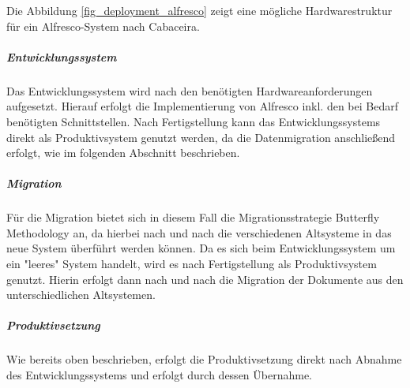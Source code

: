 Die Abbildung \ref{fig_deployment_alfresco} zeigt eine mögliche Hardwarestruktur für ein Alfresco-System nach Cabaceira.\cite{cabaceira_alfresco_2015}

\subparagraph{Entwicklungssystem}
Das Entwicklungssystem wird nach den benötigten Hardwareanforderungen aufgesetzt. Hierauf erfolgt die Implementierung von Alfresco inkl. den bei Bedarf benötigten Schnittstellen. Nach Fertigstellung kann das Entwicklungssystems direkt als Produktivsystem genutzt werden, da die Datenmigration anschließend erfolgt, wie im folgenden Abschnitt beschrieben.

\subparagraph{Migration}
Für die Migration bietet sich in diesem Fall die Migrationsstrategie Butterfly Methodology an, da hierbei nach und nach die verschiedenen Altsysteme in das neue System überführt werden können. Da es sich beim Entwicklungssystem um ein "leeres" System handelt, wird es nach Fertigstellung als Produktivsystem genutzt. Hierin erfolgt dann nach und nach die Migration der Dokumente aus den unterschiedlichen Altsystemen.

\subparagraph{Produktivsetzung}
Wie bereits oben beschrieben, erfolgt die Produktivsetzung direkt nach Abnahme des Entwicklungssystems und erfolgt durch dessen Übernahme.

